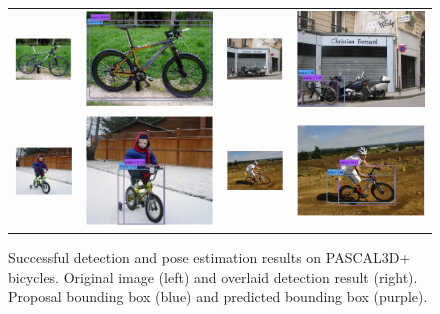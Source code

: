 \documentclass[10pt,twocolumn,letterpaper]{article}
\begin{document}
\begin{figure}[h]
\begin{tabular}{|cc|cc|}
  \includegraphics[width=0.22\linewidth]{supp/pas_bicycle1a.png} &
  \includegraphics[width=0.22\linewidth]{supp/pas_bicycle1b.png} & 
  \includegraphics[width=0.22\linewidth]{supp/pas_bicycle2a.png} &
  \includegraphics[width=0.22\linewidth]{supp/pas_bicycle2b.png}  \\
  \includegraphics[width=0.22\linewidth]{supp/pas_bicycle11a.png} &
  \includegraphics[width=0.22\linewidth]{supp/pas_bicycle11b.png} & 
  \includegraphics[width=0.22\linewidth]{supp/pas_bicycle12a.png} &
  \includegraphics[width=0.22\linewidth]{supp/pas_bicycle12b.png}  \\
  \hline
  \end{tabular}
\caption{Successful detection and pose estimation results on
    PASCAL3D+~\cite{Xiang14} bicycles. Original image (left) and
  overlaid detection result (right). Proposal bounding box (blue) and
  predicted bounding box (purple).} 
  \label{fig:pascal3d_bicycle_good}
\end{figure}
\end{document}
